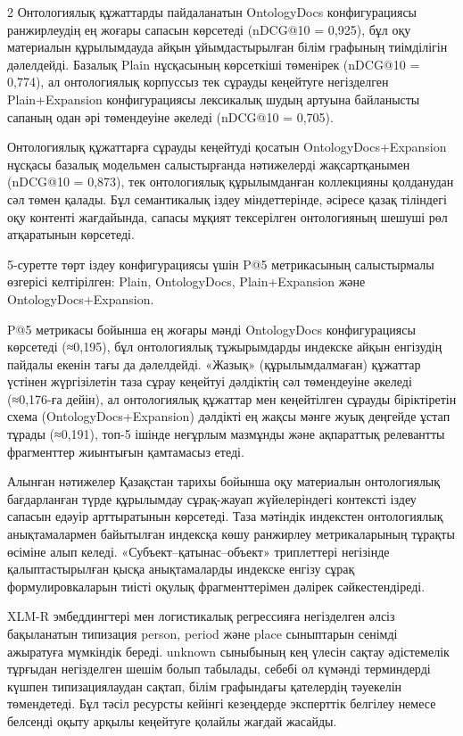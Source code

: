 \begin{multicols}{2}
Онтологиялық құжаттарды пайдаланатын OntologyDocs конфигурациясы
ранжирлеудің ең жоғары сапасын көрсетеді (nDCG@10 = 0,925), бұл оқу
материалын құрылымдауда айқын ұйымдастырылған білім графының тиімділігін
дәлелдейді. Базалық Plain нұсқасының көрсеткіші төменірек (nDCG@10 =
0,774), ал онтологиялық корпуссыз тек сұрауды кеңейтуге негізделген
Plain+Expansion конфигурациясы лексикалық шудың артуына байланысты
сапаның одан әрі төмендеуіне әкеледі (nDCG@10 = 0,705).

Онтологиялық құжаттарға сұрауды кеңейтуді қосатын OntologyDocs+Expansion
нұсқасы базалық модельмен салыстырғанда нәтижелерді жақсартқанымен
(nDCG@10 = 0,873), тек онтологиялық құрылымданған коллекцияны қолданудан
сәл төмен қалады. Бұл семантикалық іздеу міндеттерінде, әсіресе қазақ
тіліндегі оқу контенті жағдайында, сапасы мұқият тексерілген
онтологияның шешуші рөл атқаратынын көрсетеді.

5-суретте төрт іздеу конфигурациясы үшін P@5 метрикасының салыстырмалы
өзгерісі келтірілген: Plain, OntologyDocs, Plain+Expansion және
OntologyDocs+Expansion.

P@5 метрикасы бойынша ең жоғары мәнді OntologyDocs конфигурациясы
көрсетеді (≈0,195), бұл онтологиялық тұжырымдарды индекске айқын
енгізудің пайдалы екенін тағы да дәлелдейді. «Жазық» (құрылымдалмаған)
құжаттар үстінен жүргізілетін таза сұрау кеңейтуі дәлдіктің сәл
төмендеуіне әкеледі (≈0,176-ға дейін), ал онтологиялық құжаттар мен
кеңейтілген сұрауды біріктіретін схема (OntologyDocs+Expansion) дәлдікті
ең жақсы мәнге жуық деңгейде ұстап тұрады (≈0,191), топ-5 ішінде
неғұрлым мазмұнды және ақпараттық релевантты фрагменттер жиынтығын
қамтамасыз етеді.

Алынған нәтижелер Қазақстан тарихы бойынша оқу материалын онтологиялық
бағдарланған түрде құрылымдау сұрақ-жауап жүйелеріндегі контексті іздеу
сапасын едәуір арттыратынын көрсетеді. Таза мәтіндік индекстен
онтологиялық анықтамалармен байытылған индексқа көшу ранжирлеу
метрикаларының тұрақты өсіміне алып келеді. «Субъект--қатынас--объект»
триплеттері негізінде қалыптастырылған қысқа анықтамаларды индекске
енгізу сұрақ формулировкаларын тиісті оқулық фрагменттерімен дәлірек
сәйкестендіреді.

XLM-R эмбеддингтері мен логистикалық регрессияға негізделген әлсіз
бақыланатын типизация person, period және place сыныптарын сенімді
ажыратуға мүмкіндік береді. unknown сыныбының кең үлесін сақтау
әдістемелік тұрғыдан негізделген шешім болып табылады, себебі ол күмәнді
терминдерді күшпен типизациялаудан сақтап, білім графындағы қателердің
тәуекелін төмендетеді. Бұл тәсіл ресурсты кейінгі кезеңдерде эксперттік
белгілеу немесе белсенді оқыту арқылы кеңейтуге қолайлы жағдай жасайды.


\end{multicols}
